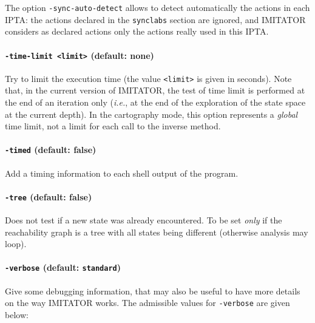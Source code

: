 \documentclass[a4paper,11pt]{report}
\makeatletter
\newcommand{\imitator}{\textsf{IMITATOR}}
\newcommand{\IPTA}{IPTA}
\newcommand{\styleIMI}[1]{\textcolor{imicolor}{\texttt{#1}}}
\newcommand{\styleOption}[1]{\textcolor{optioncolor}{\texttt{#1}}}
\newcommand{\ie}{\textcolor{colorok}{\textit{i.e.},\@}}
\makeatother
\begin{document}
The option \styleOption{-sync-auto-detect} allows to detect automatically the actions in each \IPTA{}: the actions declared in the \styleIMI{synclabs} section are ignored, and \imitator{} considers as declared actions only the actions really used in this \IPTA{}.


\paragraph{\styleOption{-time-limit <limit>} (default: none)}
Try to limit the execution time (the value \styleOption{<limit>} is given in seconds).
Note that, in the current version of \imitator{}, the test of time limit is performed at the end of an iteration only (\ie{} at the end of the exploration of the state space at the current depth).
In the cartography mode, this option represents a \emph{global} time limit, not a limit for each call to the inverse method.


\paragraph{\styleOption{-timed} (default: false)}
Add a timing information to each shell output of the program.



\paragraph{\styleOption{-tree} (default: false)}
Does not test if a new state was already encountered.
To be set \emph{only} if the reachability graph is a tree with all states being different (otherwise analysis may loop). 




\paragraph{\styleOption{-verbose} (default: \styleOption{standard})}

Give some debugging information, that may also be useful to have more details on the way \imitator{} works.
The admissible values for \styleOption{-verbose} are given below:
\end{document}
